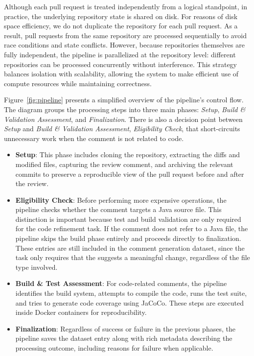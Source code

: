 Although each pull request is treated independently from a logical standpoint, in practice, the
underlying repository state is shared on disk. For reasons of disk space efficiency, we do not
duplicate the repository for each pull request. As a result, pull requests from the same repository
are processed sequentially to avoid race conditions and state conflicts. However, because
repositories themselves are fully independent, the pipeline is parallelized at the repository level:
different repositories can be processed concurrently without interference. This strategy balances
isolation with scalability, allowing the system to make efficient use of compute resources while
maintaining correctness.

Figure~\ref{fig:pipeline} presents a simplified overview of the pipeline’s control flow. The diagram
groups the processing steps into three main phases: \textit{Setup}, \textit{Build \& Validation
	Assessment}, and \textit{Finalization}. There is also a decision point between \textit{Setup} and
\textit{Build \& Validation Assessment}, \textit{Eligibility Check}, that short-circuits unnecessary
work when the comment is not related to code.

\begin{itemize}
	\item \textbf{Setup}: This phase includes cloning the repository, extracting the diffs and
	      modified files, capturing the review comment, and archiving the relevant commits to preserve
	      a reproducible view of the pull request before and after the review.

	\item \textbf{Eligibility Check}: Before performing more expensive operations, the pipeline
	      checks whether the comment targets a Java source file. This distinction is important because
	      test and build validation are only required for the code refinement task. If the comment
	      does not refer to a Java file, the pipeline skips the build phase entirely and proceeds
	      directly to finalization. These entries are still included in the comment generation
	      dataset, since the task only requires that the \revComment suggests a meaningful change,
	      regardless of the file type involved.

	\item \textbf{Build \& Test Assessment}: For code-related comments, the pipeline identifies the build system,
	      attempts to compile the code, runs the test suite, and tries to generate code coverage using
	      JaCoCo. These steps are executed inside Docker containers for reproducibility.

	\item \textbf{Finalization}: Regardless of success or failure in the previous phases, the
	      pipeline saves the dataset entry along with rich metadata describing the processing outcome,
	      including reasons for failure when applicable.
\end{itemize}

